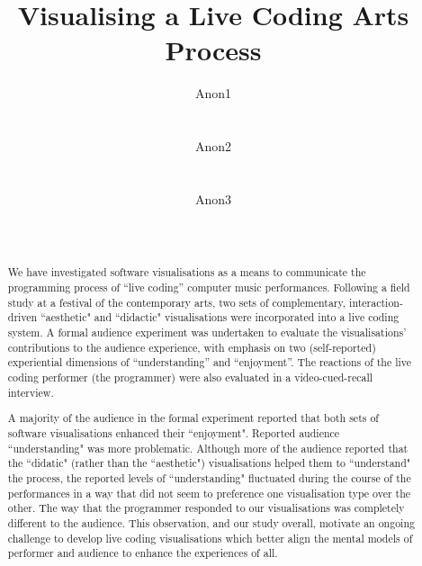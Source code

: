 \documentclass{sig-alternate}
\begin{document}

\title{Visualising a Live Coding Arts Process}

\author{
\alignauthor Anon1\\
       \affaddr{-}\\
       \affaddr{-}\\
       \email{-}
\alignauthor Anon2\\
       \affaddr{-}\\
       \affaddr{-}\\
       \email{-}
\alignauthor Anon3\\
       \affaddr{-}\\
       \affaddr{-}\\
       \email{-}
}

\maketitle
\begin{abstract}

We have investigated software visualisations as a means to communicate the programming process of ``live coding'' computer music performances. Following a field study at a festival of the contemporary arts, two sets of complementary, interaction-driven ``aesthetic" and ``didactic" visualisations were incorporated into a live coding system. A formal audience experiment was undertaken to evaluate the visualisations' contributions to the audience experience, with emphasis on two (self-reported) experiential dimensions of  ``understanding'' and ``enjoyment''. The reactions of the live coding performer (the programmer) were also evaluated in a video-cued-recall interview.

A majority of the audience in the formal experiment reported that both sets of software visualisations enhanced their ``enjoyment". Reported audience ``understanding" was more problematic. Although more of the audience reported that the ``didatic" (rather than the ``aesthetic") visualisations helped them to ``understand" the process, the reported levels of ``understanding" fluctuated during the course of the performances in a way that did not seem to preference one visualisation type over the other. The way that the programmer responded to our visualisations was completely different to the audience. This observation, and our study overall, motivate an ongoing challenge to develop live coding visualisations which better align the mental models of performer and audience to enhance the experiences of all.

\end{abstract}
\end{document}
